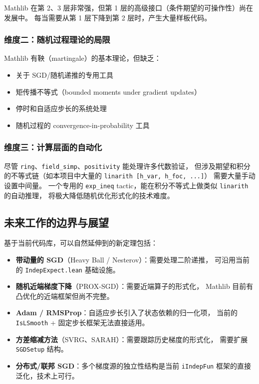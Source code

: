\documentclass[12pt, a4paper]{article}
\newcommand{\lean}[1]{\texttt{#1}}
\begin{document}
Mathlib 在第 2、3 层非常强，但第 1 层的高级接口（条件期望的可操作性）尚在发展中。
每当需要从第 1 层下降到第 2 层时，产生大量样板代码。

\subsubsection{维度二：随机过程理论的局限}

Mathlib 有鞅（martingale）的基本理论，但缺乏：
\begin{itemize}
  \item 关于 SGD/随机递推的专用工具
  \item 矩传播不等式（bounded moments under gradient updates）
  \item 停时和自适应步长的系统处理
  \item 随机过程的 convergence-in-probability 工具
\end{itemize}

\subsubsection{维度三：计算层面的自动化}

尽管 \lean{ring}、\lean{field\_simp}、\lean{positivity} 能处理许多代数验证，
但涉及期望和积分的不等式链（如本项目中大量的 \lean{linarith [h\_var, h\_foc, ...]}）
需要大量手动设置中间量。
一个专用的 \lean{exp\_ineq} tactic，能在积分不等式上做类似 \lean{linarith} 的自动推理，
将极大降低随机优化形式化的技术难度。

\subsection{未来工作的边界与展望}

基于当前代码库，可以自然延伸到的新定理包括：

\begin{itemize}
  \item \textbf{带动量的 SGD}（Heavy Ball / Nesterov）：需要处理二阶递推，
        可沿用当前的 \lean{IndepExpect.lean} 基础设施。
  \item \textbf{随机近端梯度下降}（PROX-SGD）：需要近端算子的形式化，
        Mathlib 目前有凸优化的近端框架但尚不完整。
  \item \textbf{Adam / RMSProp}：自适应步长引入了状态依赖的归一化项，
        当前的 \lean{IsLSmooth} + 固定步长框架无法直接适用。
  \item \textbf{方差缩减方法}（SVRG、SARAH）：需要跟踪历史梯度的形式化，
        需要扩展 \lean{SGDSetup} 结构。
  \item \textbf{分布式/联邦 SGD}：多个梯度源的独立性结构是当前 \lean{iIndepFun}
        框架的直接泛化，技术上可行。
\end{itemize}
\end{document}
